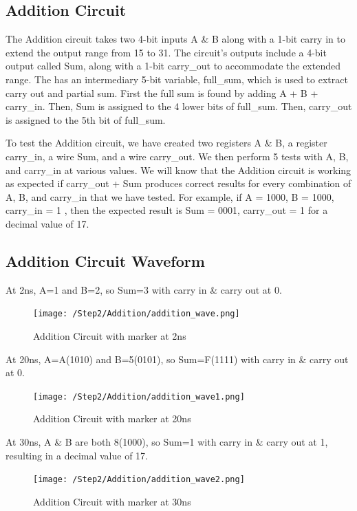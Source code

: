 \documentclass[12pt]{article}
\begin{document}
\subsection{Addition Circuit}
The Addition circuit takes two 4-bit inputs A & B along with a 1-bit carry in to extend the output range from 15 to 31. The circuit’s outputs include  a 4-bit output called Sum, along with a 1-bit carry_out to accommodate the extended range. The has an intermediary 5-bit variable, full_sum, which is used to extract carry out and partial sum. First the full sum is found by adding A + B + carry_in. Then, Sum is assigned to the 4 lower bits of full_sum. Then, carry_out is assigned to the 5th bit of full_sum. 
 

To test the Addition circuit, we have created two registers A & B, a register carry_in, a wire Sum, and a wire carry_out. We then perform 5 tests with A, B, and carry_in at various values. We will know that the Addition circuit is working as expected if carry_out + Sum produces correct results for every combination of A, B, and carry_in that we have tested. For example, if A = 1000, B = 1000, carry_in = 1 , then the expected result is Sum = 0001, carry_out = 1 for a decimal value of 17.
 

\subsection{Addition Circuit Waveform} 

At 2ns, A=1 and B=2, so Sum=3 with  carry in & carry out at 0.
\begin{figure}[h]
 \centering
 \texttt{[image: /Step2/Addition/addition\_wave.png]}
 \caption{Addition Circuit with marker at 2ns}
 \label{fig:enter-label} 
\end{figure} 

At 20ns, A=A(1010) and B=5(0101), so Sum=F(1111) with carry in & carry out at 0.
 \begin{figure}[h]
 \centering 
\texttt{[image: /Step2/Addition/addition\_wave1.png]}
 \caption{Addition Circuit with marker at 20ns}
 \label{fig:enter-label}
 \end{figure}

At 30ns, A & B are both 8(1000), so Sum=1 with carry in & carry out at 1, resulting in a decimal value of 17.
 \begin{figure}[h]
 \centering 
\texttt{[image: /Step2/Addition/addition\_wave2.png]}
 \caption{Addition Circuit with marker at 30ns}
 \label{fig:enter-label}
 \end{figure}
\end{document}

